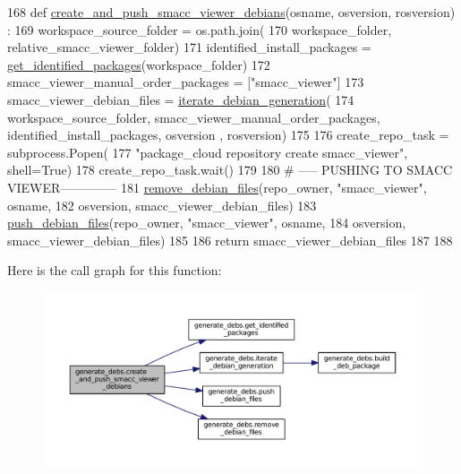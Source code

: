 \begin{DoxyCode}
168 \textcolor{keyword}{def }\hyperlink{namespacegenerate__debs_a9a6167ed98fbdc7b1e1c56da5652cf19}{create\_and\_push\_smacc\_viewer\_debians}(osname, osversion, rosversion)
      :
169     workspace\_source\_folder = os.path.join(
170         workspace\_folder, relative\_smacc\_viewer\_folder)
171     identified\_install\_packages = \hyperlink{namespacegenerate__debs_aa91b87c6d9c3ed04015845cc9298431a}{get\_identified\_packages}(workspace\_folder)
172     smacc\_viewer\_manual\_order\_packages = [\textcolor{stringliteral}{"smacc\_viewer"}]
173     smacc\_viewer\_debian\_files = \hyperlink{namespacegenerate__debs_a2615a6fc7860b6aa9e920e6b4d886589}{iterate\_debian\_generation}(
174         workspace\_source\_folder, smacc\_viewer\_manual\_order\_packages, identified\_install\_packages, osversion
      , rosversion)
175 
176     create\_repo\_task = subprocess.Popen(
177         \textcolor{stringliteral}{"package\_cloud repository create smacc\_viewer"}, shell=\textcolor{keyword}{True})
178     create\_repo\_task.wait()
179 
180     \textcolor{comment}{# ----- PUSHING TO SMACC VIEWER--------------}
181     \hyperlink{namespacegenerate__debs_a08095040d038b3613ad0e77fd4e7f60e}{remove\_debian\_files}(repo\_owner, \textcolor{stringliteral}{"smacc\_viewer"},  osname,
182                         osversion, smacc\_viewer\_debian\_files)
183     \hyperlink{namespacegenerate__debs_a9b22f5ad65b40b7903c467eda308e575}{push\_debian\_files}(repo\_owner, \textcolor{stringliteral}{"smacc\_viewer"}, osname,
184                       osversion, smacc\_viewer\_debian\_files)
185 
186     \textcolor{keywordflow}{return} smacc\_viewer\_debian\_files
187 
188 
\end{DoxyCode}


Here is the call graph for this function\+:
\nopagebreak
\begin{figure}[H]
\begin{center}
\leavevmode
\includegraphics[width=350pt]{namespacegenerate__debs_a9a6167ed98fbdc7b1e1c56da5652cf19_cgraph}
\end{center}
\end{figure}


